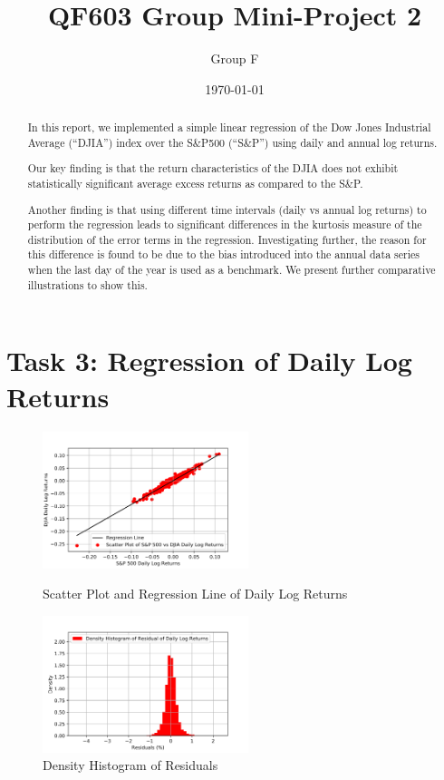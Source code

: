 \documentclass[a4paper]{article}
\title{QF603 Group Mini-Project 2}
\author{Group F}
\date{\today}
\begin{document}
	\maketitle
	
	\begin{abstract}
		In this report, we implemented a simple linear regression of the Dow Jones Industrial Average (“DJIA”) index over the S\&P500 (“S\&P”) using daily and annual log returns.
		
	\vspace{6pt}
	
		Our key finding is that the return characteristics of the DJIA does not exhibit statistically significant average excess returns as compared to the S\&P.
		
	\vspace{6pt} 
	
		Another finding is that using different time intervals (daily vs annual log returns) to perform the regression leads to significant differences in the kurtosis measure of the distribution of the error terms in the regression. Investigating further, the reason for this difference is found to be due to the bias introduced into the annual data series when the last day of the year is used as a benchmark. We present further comparative illustrations to show this. 
		
		 	
	\end{abstract} 
	
	\newpage
	\setcounter{secnumdepth}{1}
	\section*{Task 3: Regression of Daily Log Returns}
	\label{sec:introduction}
	
	\begin{figure}[htbp]
		\centering
		\begin{minipage}[t]{0.48\textwidth}
			\centering
			\includegraphics[width=6cm]{Daily_Scatter.png}
			\captionsetup{font=small}
			\caption{Scatter Plot and Regression Line of Daily Log Returns}
		\end{minipage}
		\begin{minipage}[t]{0.48\textwidth}
			\centering
			\includegraphics[width=6cm]{Daily_Hist.png}
			\captionsetup{font=small}
			\caption{Density Histogram of Residuals}
		\end{minipage}
	\end{figure}
	
\end{document}

